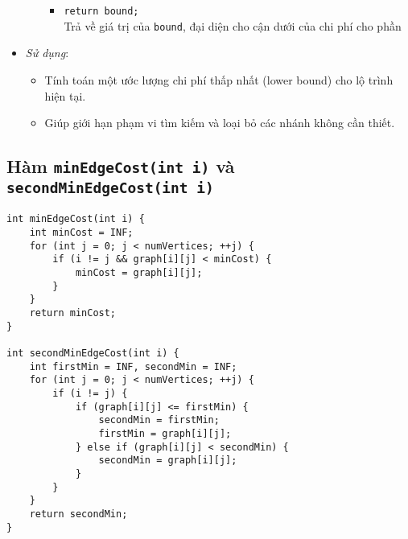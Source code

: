 \documentclass[a4paper]{article}
\begin{document}
\begin{itemize}
\begin{itemize}
\begin{itemize}
    \item \texttt{return bound;} \\
    Trả về giá trị của \texttt{bound}, đại diện cho cận dưới của chi phí cho phần
    \end{itemize}
    \end{itemize}
    \item \textit{Sử dụng}:
    \begin{itemize}
        \item Tính toán một ước lượng chi phí thấp nhất (lower bound) cho lộ trình hiện tại.
        \item Giúp giới hạn phạm vi tìm kiếm và loại bỏ các nhánh không cần thiết.
    \end{itemize}
    
\end{itemize}

\subsection*{Hàm \texttt{minEdgeCost(int i)} và \texttt{secondMinEdgeCost(int i)}}
\begin{lstlisting}[style=cppstyle]
int minEdgeCost(int i) {
    int minCost = INF;
    for (int j = 0; j < numVertices; ++j) {
        if (i != j && graph[i][j] < minCost) {
            minCost = graph[i][j];
        }
    }
    return minCost;
}

int secondMinEdgeCost(int i) {
    int firstMin = INF, secondMin = INF;
    for (int j = 0; j < numVertices; ++j) {
        if (i != j) {
            if (graph[i][j] <= firstMin) {
                secondMin = firstMin;
                firstMin = graph[i][j];
            } else if (graph[i][j] < secondMin) {
                secondMin = graph[i][j];
            }
        }
    }
    return secondMin;
}
\end{lstlisting}
\end{document}

